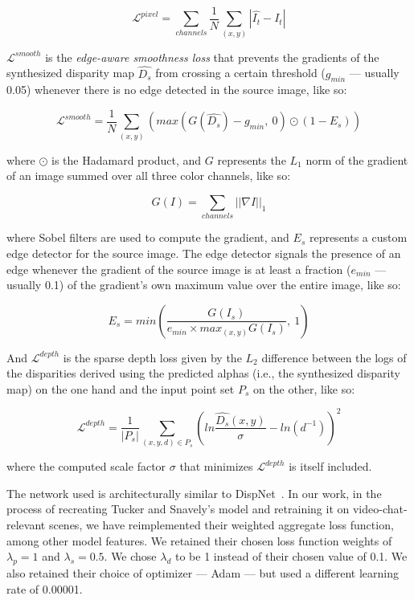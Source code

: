\begin{itemize}
    \[\mathcal{L}^{pixel} = \sum_{channels} \frac{1}{N} \sum_{(x,y)} |\hat{I_t} - I_t|\]
    
    $\mathcal{L}^{smooth}$ is the \textit{edge-aware smoothness loss} that prevents the gradients of the synthesized disparity map $\hat{D_s}$ from crossing a certain threshold ($g_{min}$ --- usually 0.05) whenever there is no edge detected in the source image, like so: 
    
    \[\mathcal{L}^{smooth} = \frac{1}{N} \sum_{(x,y)} \left(max\left(G(\hat{D_s}) - g_{min},\ 0\right) \odot (1 - E_s)\right)\]
    
    where $\odot$ is the Hadamard product, and $G$ represents the $L_1$ norm of the gradient of an image summed over all three color channels, like so:
    
    \[G(I) = \sum_{channels} ||\nabla I||_1\]
    
    where Sobel filters are used to compute the gradient, and $E_s$ represents a custom edge detector for the source image. The edge detector signals the presence of an edge whenever the gradient of the source image is at least a fraction ($e_{min}$ --- usually 0.1) of the gradient's own maximum value over the entire image, like so:
    
    \[E_s = min \left(\frac{G(I_s)}{e_{min} \times max_{(x,y)} G(I_s)},\ 1\right)\]
    
    And $\mathcal{L}^{depth}$ is the sparse depth loss given by the $L_2$ difference between the logs of the disparities derived using the predicted alphas (i.e., the synthesized disparity map) on the one hand and the input point set $P_s$ on the other, like so:
    
    \[\mathcal{L}^{depth} = \frac{1}{|P_s|} \sum_{(x,y,d) \in P_s} \left(ln\frac{\hat{D_s}(x,y)}{\sigma} - ln(d^{-1})\right)^2\]
    
    where the computed scale factor $\sigma$ that minimizes $\mathcal{L}^{depth}$ is itself included.
\end{itemize}

The network used is architecturally similar to DispNet~\cite{mayer_large_2016}. In our work, in the process of recreating Tucker and Snavely's model and retraining it on video-chat-relevant scenes, we have reimplemented their weighted aggregate loss function, among other model features. We retained their chosen loss function weights of $\lambda_p = 1$ and $\lambda_s = 0.5$. We chose $\lambda_d$ to be 1 instead of their chosen value of 0.1. We also retained their choice of optimizer --- Adam --- but used a different learning rate of 0.00001.

